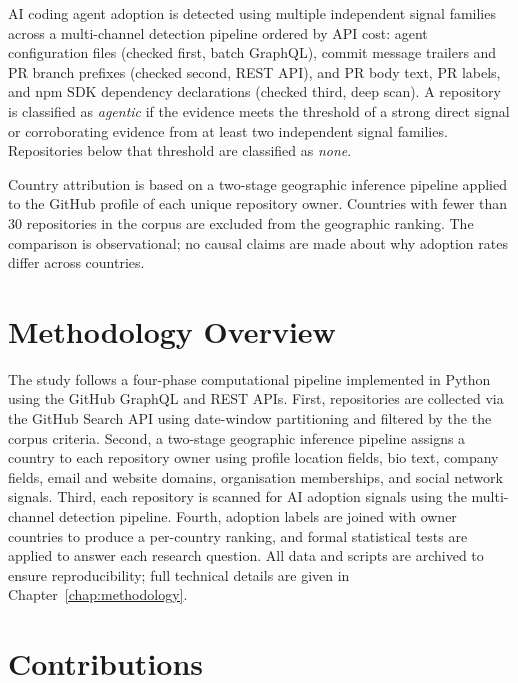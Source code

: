 AI coding agent adoption is detected using multiple independent signal families
across a multi-channel detection pipeline ordered by API cost: agent
configuration files (checked first, batch GraphQL), commit message trailers
and PR branch prefixes (checked second, REST API), and PR body text, PR
labels, and npm SDK dependency declarations (checked third, deep scan).
A repository is classified as \emph{agentic} if the evidence meets the
threshold of a strong direct signal or corroborating evidence from at least
two independent signal families. Repositories below that threshold are
classified as \emph{none}.

Country attribution is based on a two-stage geographic inference pipeline
applied to the GitHub profile of each unique repository owner. Countries with
fewer than 30 repositories in the corpus are excluded from the geographic
ranking. The comparison is observational; no causal claims are made about why
adoption rates differ across countries.

\section{Methodology Overview}
\label{sec:intro:method}

The study follows a four-phase computational pipeline implemented in Python
using the GitHub GraphQL and REST APIs. First, repositories are collected via
the GitHub Search API using date-window partitioning and filtered by the
the corpus criteria. Second, a two-stage geographic inference pipeline assigns
a country to each repository owner using profile location fields, bio text,
company fields, email and website domains, organisation memberships, and
social network signals. Third, each repository is scanned for AI adoption
signals using the multi-channel detection pipeline. Fourth, adoption
labels are joined with owner countries to produce a per-country ranking, and
formal statistical tests are applied to answer each research question. All
data and scripts are archived to ensure reproducibility; full technical
details are given in Chapter~\ref{chap:methodology}.

\section{Contributions}
\label{sec:intro:contributions}

